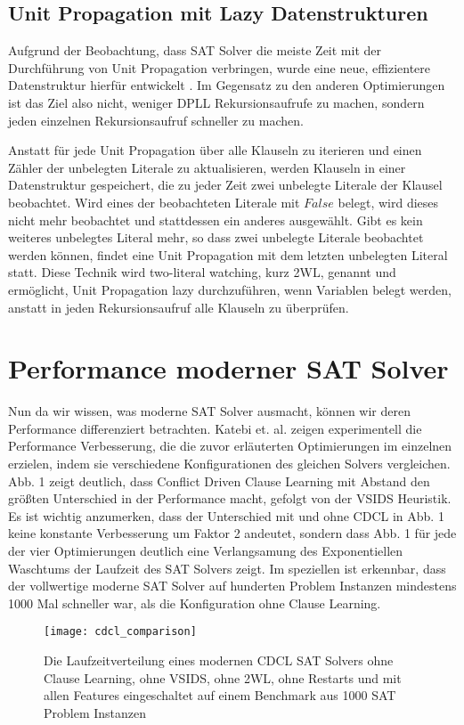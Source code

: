 \documentclass[conference,compsoc,final,a4paper]{IEEEtran}
\begin{document}
\subsection{Unit Propagation mit Lazy Datenstrukturen}
Aufgrund der Beobachtung, dass SAT Solver die meiste Zeit mit der Durchführung von Unit Propagation verbringen, wurde eine neue, effizientere Datenstruktur hierfür entwickelt \cite{anatomy_of_modern_sat_solvers}. Im Gegensatz zu den anderen Optimierungen ist das Ziel also nicht, weniger DPLL Rekursionsaufrufe zu machen, sondern jeden einzelnen Rekursionsaufruf schneller zu machen.

Anstatt für jede Unit Propagation über alle Klauseln zu iterieren und einen Zähler der unbelegten Literale zu aktualisieren, werden Klauseln in einer Datenstruktur gespeichert, die zu jeder Zeit zwei unbelegte Literale der Klausel beobachtet. Wird eines der beobachteten Literale mit $False$ belegt, wird dieses nicht mehr beobachtet und stattdessen ein anderes ausgewählt. Gibt es kein weiteres unbelegtes Literal mehr, so dass zwei unbelegte Literale beobachtet werden können, findet eine Unit Propagation mit dem letzten unbelegten Literal statt. Diese Technik wird two-literal watching, kurz 2WL, genannt und ermöglicht, Unit Propagation lazy durchzuführen, wenn Variablen belegt werden, anstatt in jeden Rekursionsaufruf alle Klauseln zu überprüfen. \cite{anatomy_of_modern_sat_solvers}

\section{Performance moderner SAT Solver}
Nun da wir wissen, was moderne SAT Solver ausmacht, können wir deren Performance differenziert betrachten. Katebi et. al. \cite{anatomy_of_modern_sat_solvers} zeigen experimentell die Performance Verbesserung, die die zuvor erläuterten Optimierungen im einzelnen erzielen, indem sie verschiedene Konfigurationen des gleichen Solvers vergleichen. Abb. 1 zeigt deutlich, dass Conflict Driven Clause Learning mit Abstand den größten Unterschied in der Performance macht, gefolgt von der VSIDS Heuristik. Es ist wichtig anzumerken, dass der Unterschied mit und ohne CDCL in Abb. 1 keine konstante Verbesserung um Faktor 2 andeutet, sondern dass Abb. 1 für jede der vier Optimierungen deutlich eine Verlangsamung des Exponentiellen Waschtums der Laufzeit des SAT Solvers zeigt. Im speziellen ist erkennbar, dass der vollwertige moderne SAT Solver auf hunderten Problem Instanzen mindestens 1000 Mal schneller war, als die Konfiguration ohne Clause Learning.
\begin{figure}[!ht]
\centering
\texttt{[image: cdcl\_comparison]}
\caption{Die Laufzeitverteilung eines modernen CDCL SAT Solvers ohne Clause Learning, ohne VSIDS, ohne 2WL, ohne Restarts und mit allen Features eingeschaltet auf einem Benchmark aus 1000 SAT Problem Instanzen ~\cite{anatomy_of_modern_sat_solvers}}
\label{fig_sim}
\end{figure}
\end{document}
